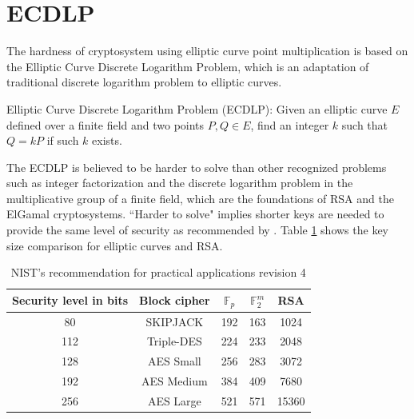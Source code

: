 \section{ECDLP}
The hardness of cryptosystem using elliptic curve point multiplication is based on the Elliptic Curve Discrete Logarithm Problem, which is an adaptation of traditional discrete logarithm problem to elliptic curves.

\begin{mydef}
Elliptic Curve Discrete Logarithm Problem (ECDLP): Given an elliptic curve $E$ defined over a finite field and two points $P,Q \in E$, find an integer $k$ such that $Q = kP$ if such $k$ exists.
\end{mydef}

The ECDLP is believed to be harder to solve than other recognized problems such as integer factorization and the discrete logarithm problem in the multiplicative group of a finite field, which are the foundations of RSA \cite{rivest1978method} and the ElGamal \cite{elgamal1985public} cryptosystems. ``Harder to solve" implies shorter keys are needed to provide the same level of security as recommended by \cite{barker2006recommendation}. Table \ref{tab:nist key length} shows the key size comparison for elliptic curves and RSA.  

\begin{table}[!h]
	\centering

	\caption{NIST's recommendation for practical applications revision 4 \cite{NSA16key}}
	\label{tab:nist key length}
	\begin{tabular}{|c|c|c|c|c|}
		\hline
		Security level in bits & Block cipher & $\mathbb{F}_p$  & $\mathbb{F}_2^m$ & RSA   \\ \hline
	\cellcolor{red}	80                     & \cellcolor{red}	SKIPJACK     & \cellcolor{red}	192 & \cellcolor{red}	163 &\cellcolor{red}	 1024  \\ \hline
		112                    & Triple-DES   & 224 & 233 & \cellcolor{orange}  2048  \\ \hline
		128                    & \cellcolor{orange} AES Small    & \cellcolor{orange}  256 & 283 & 3072  \\ \hline
		192                    & AES Medium   & 384 & 409 & \cellcolor{yellow} 7680  \\ \hline
		256                    & AES Large    & 521 & 571 & \cellcolor{yellow} 15360 \\ \hline
	\end{tabular}
\end{table}

